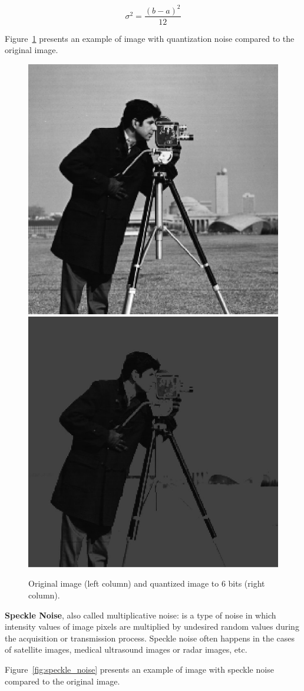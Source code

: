 \begin{equation}
\sigma^{2} = \frac{(b-a)^{2}}{12}
\end{equation}

Figure~\ref{fig:quantization_noise} presents an example of image with quantization noise compared to the original image.

\begin{figure}
    \centering 
    \includegraphics[width=0.4\columnwidth]{images/salt_pepper_origin.jpg}
    \includegraphics[width=0.4\columnwidth]{images/quantization_noise.jpg}
	\caption{Original image (left column) and quantized image to 6 bits (right column).}
	\label{fig:quantization_noise}
\end{figure}

\textbf{Speckle Noise}, also called multiplicative noise: is a type of noise in which intensity values of image pixels are multiplied by undesired random values during the acquisition or transmission process. Speckle noise often happens in the cases of satellite images, medical ultrasound images or radar images, etc.

Figure~\ref{fig:speckle_noise} presents an example of image with speckle noise compared to the original image.

